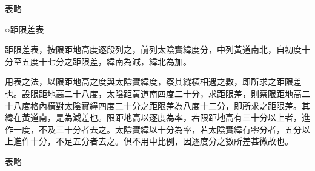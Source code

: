 \begin{pinyinscope}
表略

○距限差表

距限差表，按限距地高度逐段列之，前列太陰實緯度分，中列黃道南北，自初度十分至五度十七分之距限差，緯南為減，緯北為加。

用表之法，以限距地高之度與太陰實緯度，察其縱橫相遇之數，即所求之距限差也。設限距地高二十八度，太陰距黃道南四度二十分，求距限差，則察限距地高二十八度格內橫對太陰實緯四度二十分之距限差為八度十二分，即所求之距限差。其緯在黃道南，是為減差也。限距地高以逐度為率，若限距地高有三十分以上者，進作一度，不及三十分者去之。太陰實緯以十分為率，若太陰實緯有零分者，五分以上進作十分，不足五分者去之。俱不用中比例，因逐度分之數所差甚微故也。

表略


\end{pinyinscope}